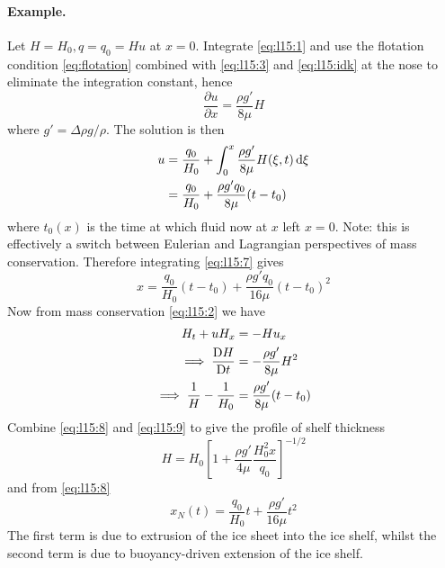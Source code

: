 \documentclass{jknotes}
\begin{document}
\paragraph{Example.} Let $H = H_0, q = q_0 = Hu$ at $x=0$. Integrate
\eqref{eq:l15:1} and use the flotation condition \eqref{eq:flotation} combined
with \eqref{eq:l15:3} and \eqref{eq:l15:idk} at the nose to eliminate the
integration constant, hence
\begin{equation}
	\frac{\partial u}{\partial x} = \frac{\rho g'}{8\mu} H
\end{equation}
where $g' = \Delta \rho g/\rho$. The solution is then
\begin{align}
	u &= \frac{q_0}{H_0} + \int_0^x \frac{\rho g'}{8\mu} H(\xi, t) \, \diffd
	\xi \\
	  &= \frac{q_0}{H_0} + \frac{\rho g' q_0}{8\mu} (t-t_0) \label{eq:l15:7}
\end{align}
where $t_0(x)$ is the time at which fluid now at $x$ left $x=0$. Note: this is
effectively a switch between Eulerian and Lagrangian perspectives of mass
conservation. Therefore integrating \eqref{eq:l15:7} gives
\begin{equation}
	x = \frac{q_0}{H_0}(t-t_0) + \frac{\rho g' q_0}{16\mu} (t-t_0)^2
	\label{eq:l15:8}
\end{equation}
Now from mass conservation \eqref{eq:l15:2} we have
\begin{align}
	H_t + uH_x &= -Hu_x \\
	\implies \frac{\mathrm{D} H}{\mathrm{D} t} &= -\frac{\rho g'}{8\mu} H^2 \\
	\implies \frac{1}{H} -\frac{1}{H_0} &= \frac{\rho g'}{8\mu} (t-t_0)
	\label{eq:l15:9}
\end{align}
Combine \eqref{eq:l15:8} and \eqref{eq:l15:9} to give the profile of shelf
thickness
\begin{equation}
	H = H_0 \left[ 1+ \frac{\rho g'}{4\mu} \frac{H_0^2 x}{q_0}\right]^{-1/2}
\end{equation}
and from \eqref{eq:l15:8}
\begin{equation}
	x_N(t) = \frac{q_0}{H_0}t + \frac{\rho g'}{16\mu} t^2
\end{equation}
The first term is due to extrusion of the ice sheet into the ice shelf, whilst
the second term is due to buoyancy-driven extension of the ice shelf.
\end{document}
